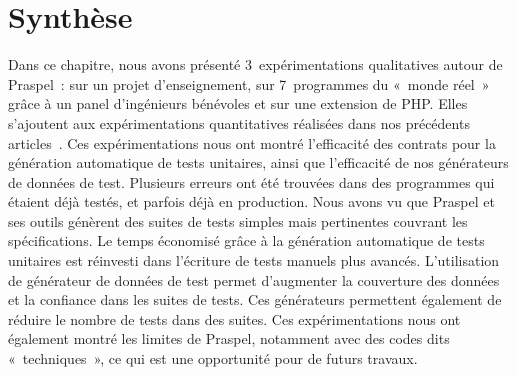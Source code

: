 \section{Synthèse}
\label{section:experimentation:other}

Dans ce chapitre, nous avons présenté 3~expérimentations qualitatives autour de
Praspel~: sur un projet d'enseignement, sur 7~programmes du «~monde réel~» grâce
à un panel d'ingénieurs bénévoles et sur une extension de PHP. Elles s'ajoutent
aux expérimentations quantitatives réalisées dans nos précédents
articles~. Ces
expérimentations nous ont montré l'efficacité des contrats pour la génération
automatique de tests unitaires, ainsi que l'efficacité de nos générateurs de
données de test. Plusieurs erreurs ont été trouvées dans des programmes qui
étaient déjà testés, et parfois déjà en production. Nous avons vu que Praspel et
ses outils génèrent des suites de tests simples mais pertinentes couvrant les
spécifications. Le temps économisé grâce à la génération automatique de tests
unitaires est réinvesti dans l'écriture de tests manuels plus avancés.
L'utilisation de générateur de données de test permet d'augmenter la couverture
des données et la confiance dans les suites de tests. Ces générateurs permettent
également de réduire le nombre de tests dans des suites. Ces expérimentations
nous ont également montré les limites de Praspel, notamment avec des codes dits
«~techniques~»,  ce qui est une opportunité pour de futurs travaux.
